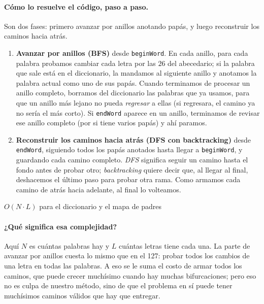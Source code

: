 \paragraph{Cómo lo resuelve el código, paso a paso.} Son dos fases: primero
avanzar por anillos anotando papás, y luego reconstruir los caminos hacia atrás.
\begin{enumerate}
  \item \textbf{Avanzar por anillos (BFS)} desde \texttt{beginWord}. En cada
    anillo, para cada palabra probamos cambiar cada letra por las $26$ del
    abecedario; si la palabra que sale está en el diccionario, la mandamos al
    siguiente anillo y anotamos la palabra actual como uno de sus papás. Cuando
    terminamos de procesar un anillo completo, borramos del diccionario las
    palabras que ya usamos, para que un anillo más lejano no pueda
    \emph{regresar} a ellas (si regresara, el camino ya no sería el más corto).
    Si \texttt{endWord} aparece en un anillo, terminamos de revisar ese anillo
    completo (por si tiene varios papás) y ahí paramos.
  \item \textbf{Reconstruir los caminos hacia atrás (DFS con backtracking)}
    desde \texttt{endWord}, siguiendo todos los papás anotados hasta llegar a
    \texttt{beginWord}, y guardando cada camino completo. \emph{DFS} significa
    seguir un camino hasta el fondo antes de probar
    otro; \emph{backtracking} quiere decir que, al llegar al final, deshacemos
    el último paso para probar otra rama. Como armamos cada camino de atrás
    hacia adelante, al final lo volteamos.
\end{enumerate}



{$O(N \cdot L)$ para el diccionario y el mapa de padres}

\paragraph{¿Qué significa esa complejidad?} Aquí $N$ es cuántas palabras hay y
$L$ cuántas letras tiene cada una. La parte de avanzar por anillos cuesta lo
mismo que en el 127: probar todos los cambios de una letra en todas las
palabras. A eso se le suma el costo de armar todos los caminos, que puede
crecer muchísimo cuando hay muchas bifurcaciones; pero eso no es culpa de
nuestro método, sino de que el problema en sí puede tener muchísimos caminos
válidos que hay que entregar.

